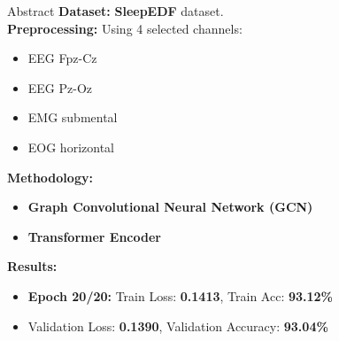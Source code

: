 \begin{frame}{Abstract}
    \textbf{Dataset:} \textbf{SleepEDF} dataset. \\[5pt]

    \textbf{Preprocessing:} Using 4 selected channels:  
    \begin{itemize}
        \item EEG Fpz-Cz
        \item EEG Pz-Oz
        \item EMG submental
        \item EOG horizontal
    \end{itemize}

    \textbf{Methodology:}  
    \begin{itemize}
        \item \textbf{Graph Convolutional Neural Network (GCN)} 
        \item \textbf{Transformer Encoder}  
    \end{itemize}

    \textbf{Results:}  
    \begin{itemize}
        \item \textbf{Epoch 20/20:} Train Loss: \textbf{0.1413}, Train Acc: \textbf{93.12\%}  
        \item Validation Loss: \textbf{0.1390}, Validation Accuracy: \textbf{93.04\%}  
    \end{itemize}
\end{frame}
